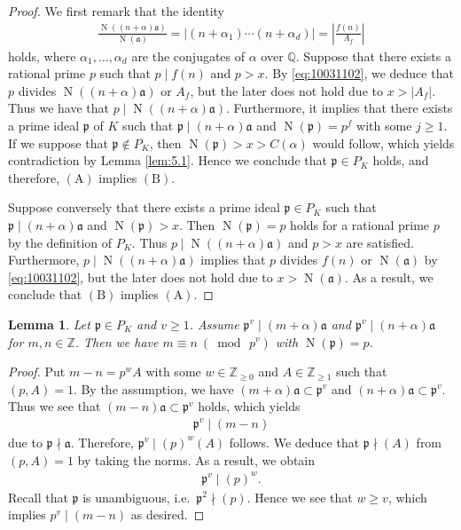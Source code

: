 \documentclass[a4paper,11pt]{amsart}
\newtheorem{lemma}[theorem]{Lemma}
\theoremstyle{definition}
\numberwithin{equation}{section}
\DeclareMathOperator{\norm}{N}
\begin{document}
\begin{proof}
We first remark that the identity
\begin{align}\label{eq:10031102}
\frac{\norm((n+\alpha)\mathfrak{a})}{\norm(\mathfrak{a})}
= \left|(n+\alpha_1) \cdots (n+\alpha_d)\right|
= \left|\frac{f(n)}{A_f}\right|
\end{align}
holds, where $\alpha_1,\ldots,\alpha_d$ are the conjugates of $\alpha$ over $\mathbb{Q}$. 
Suppose that there exists a rational prime $p$ such that $p \mid f(n)$ and $p>x$. 
By \eqref{eq:10031102}, we deduce that $p$ divides $\norm((n+\alpha)\mathfrak{a})$ or $A_f$, but the later does not hold due to $x>|A_f|$. 
Thus we have that $p \mid \norm((n+\alpha)\mathfrak{a})$. 
Furthermore, it implies that there exists a prime ideal $\mathfrak{p}$ of $K$ such that $\mathfrak{p} \mid (n+\alpha)\mathfrak{a}$ and $\norm(\mathfrak{p})=p^f$ with some $j \geq1$. 
If we suppose that $\mathfrak{p} \notin P_K$, then $\norm(\mathfrak{p})>x>C(\alpha)$ would follow, which yields contradiction by Lemma \ref{lem:5.1}. 
Hence we conclude that $\mathfrak{p} \in P_K$ holds, and therefore, $(\mathrm{A})$ implies $(\mathrm{B})$. 

Suppose conversely that there exists a prime ideal $\mathfrak{p} \in P_K$ such that $\mathfrak{p} \mid (n+\alpha)\mathfrak{a}$ and $\norm(\mathfrak{p})>x$. 
Then $\norm(\mathfrak{p})=p$ holds for a rational prime $p$ by the definition of $P_K$. 
Thus $p \mid \norm((n+\alpha)\mathfrak{a})$ and $p>x$ are satisfied. 
Furthermore, $p \mid \norm((n+\alpha)\mathfrak{a})$ implies that $p$ divides $f(n)$ or $\norm(\mathfrak{a})$ by \eqref{eq:10031102}, but the later does not hold due to $x>\norm(\mathfrak{a})$. 
As a result, we conclude that $(\mathrm{B})$ implies $(\mathrm{A})$. 
\end{proof}


\begin{lemma}\label{lem:5.3}
Let $\mathfrak{p} \in P_K$ and $v \geq1$. 
Assume $\mathfrak{p}^v \mid (m+\alpha)\mathfrak{a}$ and $\mathfrak{p}^v \mid (n+\alpha)\mathfrak{a}$ for $m,n \in \mathbb{Z}$. 
Then we have $m \equiv n ~(\bmod\,{p^v})$ with $\norm(\mathfrak{p})=p$. 
\end{lemma}

\begin{proof}
Put $m-n=p^w A$ with some $w \in \mathbb{Z}_{\geq0}$ and $A \in \mathbb{Z}_{\geq1}$ such that $(p,A)=1$. 
By the assumption, we have $(m+\alpha)\mathfrak{a} \subset \mathfrak{p}^v$ and $(n+\alpha)\mathfrak{a} \subset \mathfrak{p}^v$. 
Thus we see that $(m-n)\mathfrak{a} \subset \mathfrak{p}^v$ holds, which yields
\begin{align*}
\mathfrak{p}^v \mid (m-n) 
\end{align*}
due to $\mathfrak{p} \nmid \mathfrak{a}$. 
Therefore, $\mathfrak{p}^v \mid (p)^w (A)$ follows. 
We deduce that $\mathfrak{p} \nmid (A)$ from $(p,A)=1$ by taking the norms. 
As a result, we obtain 
\begin{align*}
\mathfrak{p}^v \mid (p)^w. 
\end{align*}
Recall that $\mathfrak{p}$ is unambiguous, i.e.\ $\mathfrak{p}^2 \nmid (p)$. 
Hence we see that $w \geq v$, which implies $p^v \mid (m-n)$ as desired. 
\end{proof}
\end{document}
